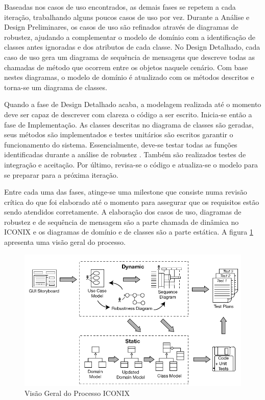 \documentclass[
	12pt,				%
	openright,			%
	oneside,			%
	a4paper,			%
	english,			%
	spanish,			%
	brazil				%
	]{abntex2}
\begin{document}
	Baseadas nos casos de uso encontrados, as demais fases se repetem a cada iteração, trabalhando alguns poucos casos de uso por vez. Durante a Análise e Design Preliminares, os casos de uso são refinados através de diagramas de robustez, ajudando a complementar o modelo de domínio com a identificação de classes antes ignoradas e dos atributos de cada classe. No Design Detalhado, cada caso de uso gera um diagrama de sequência de mensagens que descreve todas as chamadas de método que ocorrem entre os objetos naquele cenário. Com base nestes diagramas, o modelo de domínio é atualizado com os métodos descritos e torna-se um diagrama de classes.
	
	Quando a fase de Design Detalhado acaba, a modelagem realizada até o momento deve ser capaz de descrever com clareza o código a ser escrito. Inicia-se então a fase de Implementação. As classes descritas no diagrama de classes são geradas, seus métodos são implementados e testes unitários são escritos garantir o funcionamento do sistema. Essencialmente, deve-se testar todas as funções identificadas durante a análise de robustez \cite{iconix}. Também são realizados testes de integração e aceitação. Por último, revisa-se o código e atualiza-se o modelo para se preparar para a próxima iteração.  
	
	Entre cada uma das fases, atinge-se uma milestone que consiste numa revisão crítica do que foi elaborado até o momento para assegurar que os requisitos estão sendo atendidos corretamente. A elaboração dos casos de uso, diagramas de robustez e de sequência de mensagem são a parte chamada de dinâmica no ICONIX e os diagramas de domínio e de classes são a parte estática. A figura \ref{iconix_diagram} apresenta uma visão geral do processo.
	
\begin{figure}[!htb]
\centering
\includegraphics[scale=0.5]{iconix}
\caption{Visão Geral do Processo ICONIX \cite{iconix}}
\label{iconix_diagram}
\end{figure}
\end{document}
